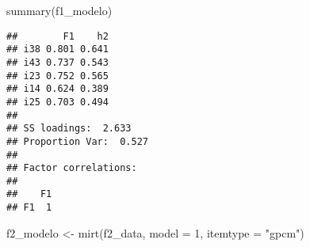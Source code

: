 \documentclass[
]{article}
\newenvironment{Shaded}{\begin{snugshade}}{\end{snugshade}}
\newcommand{\AttributeTok}[1]{\textcolor[rgb]{0.77,0.63,0.00}{#1}}
\newcommand{\DecValTok}[1]{\textcolor[rgb]{0.00,0.00,0.81}{#1}}
\newcommand{\FunctionTok}[1]{\textcolor[rgb]{0.00,0.00,0.00}{#1}}
\newcommand{\NormalTok}[1]{#1}
\newcommand{\OtherTok}[1]{\textcolor[rgb]{0.56,0.35,0.01}{#1}}
\newcommand{\StringTok}[1]{\textcolor[rgb]{0.31,0.60,0.02}{#1}}
\begin{document}
\begin{Shaded}
\begin{Highlighting}[]
\FunctionTok{summary}\NormalTok{(f1\_modelo)}
\end{Highlighting}
\end{Shaded}

\begin{verbatim}
##        F1    h2
## i38 0.801 0.641
## i43 0.737 0.543
## i23 0.752 0.565
## i14 0.624 0.389
## i25 0.703 0.494
## 
## SS loadings:  2.633 
## Proportion Var:  0.527 
## 
## Factor correlations: 
## 
##    F1
## F1  1
\end{verbatim}

\begin{Shaded}
\begin{Highlighting}[]
\NormalTok{f2\_modelo }\OtherTok{\textless{}{-}} \FunctionTok{mirt}\NormalTok{(f2\_data, }\AttributeTok{model =} \DecValTok{1}\NormalTok{, }\AttributeTok{itemtype =} \StringTok{"gpcm"}\NormalTok{)}
\end{Highlighting}
\end{Shaded}
\end{document}
